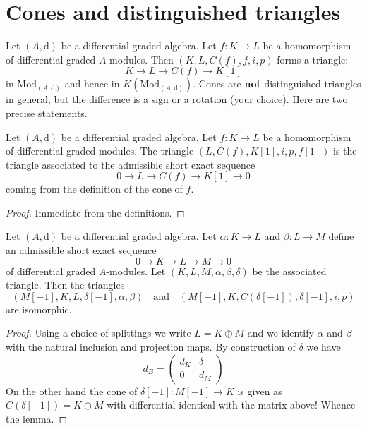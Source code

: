 \section{Cones and distinguished triangles}
\label{section-cones-and-triangles}

\noindent
Let $(A, \text{d})$ be a differential graded algebra.
Let $f : K \to L$ be a homomorphism of differential graded $A$-modules.
Then $(K, L, C(f), f, i, p)$ forms a triangle:
$$
K \to L \to C(f) \to K[1]
$$
in $\text{Mod}_{(A, \text{d})}$ and hence in $K(\text{Mod}_{(A, \text{d})})$.
Cones are {\bf not} distinguished triangles in general, but the difference
is a sign or a rotation (your choice). Here are two precise statements.

\begin{lemma}
\label{lemma-rotate-cone}
Let $(A, \text{d})$ be a differential graded algebra.
Let $f : K \to L$ be a homomorphism of differential graded modules.
The triangle $(L, C(f), K[1], i, p, f[1])$ is
the triangle associated to the admissible short exact sequence
$$
0 \to L \to C(f) \to K[1] \to 0
$$
coming from the definition of the cone of $f$.
\end{lemma}

\begin{proof}
Immediate from the definitions.
\end{proof}

\begin{lemma}
\label{lemma-rotate-triangle}
Let $(A, \text{d})$ be a differential graded algebra.
Let $\alpha : K \to L$ and $\beta : L \to M$
define an admissible short exact sequence
$$
0 \to K \to L \to M \to 0
$$
of differential graded $A$-modules.
Let $(K, L, M, \alpha, \beta, \delta)$
be the associated triangle. Then the triangles
$$
(M[-1], K, L, \delta[-1], \alpha, \beta)
\quad\text{and}\quad
(M[-1], K, C(\delta[-1]), \delta[-1], i, p)
$$
are isomorphic.
\end{lemma}

\begin{proof}
Using a choice of splittings we write $L = K \oplus M$ and we identify
$\alpha$ and $\beta$ with the natural inclusion and projection maps.
By construction of $\delta$ we have
$$
d_B =
\left(
\begin{matrix}
d_K & \delta \\
0 & d_M
\end{matrix}
\right)
$$
On the other hand the cone of $\delta[-1] : M[-1] \to K$
is given as $C(\delta[-1]) = K \oplus M$ with differential identical
with the matrix above! Whence the lemma.
\end{proof}

